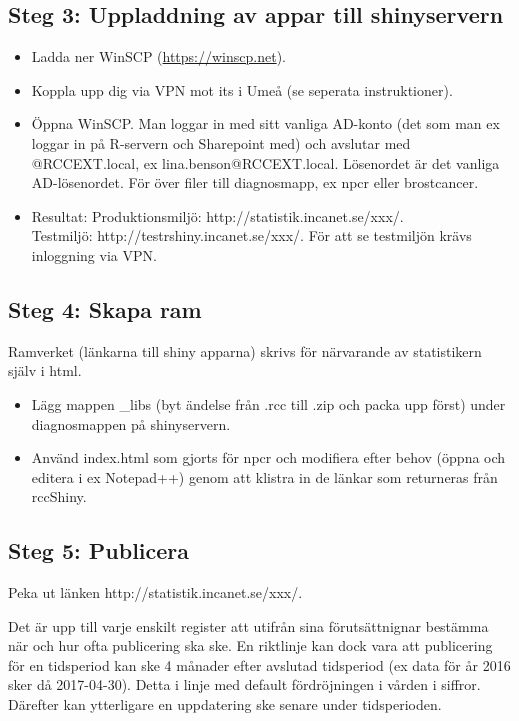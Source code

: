 \documentclass[12pt, a4paper,twoside]{report}
\begin{document}
\subsection{Steg 3: Uppladdning av appar till shinyservern}
\begin{itemize}
\item Ladda ner WinSCP (\url{https://winscp.net}).
\item Koppla upp dig via VPN mot its i Umeå (se seperata instruktioner). 
\item Öppna WinSCP. Man loggar in med sitt vanliga AD-konto (det som man ex loggar in på R-servern och Sharepoint med) och avslutar med @RCCEXT.local, ex lina.benson@RCCEXT.local. Lösenordet är det vanliga AD-lösenordet. För över filer till diagnosmapp, ex npcr eller brostcancer.
\item Resultat: Produktionsmiljö: http://statistik.incanet.se/xxx/. \\
Testmiljö: http://testrshiny.incanet.se/xxx/. För att se testmiljön krävs inloggning via VPN. 
\end{itemize}
\subsection{Steg 4: Skapa ram}
Ramverket (länkarna till shiny apparna) skrivs för närvarande av statistikern själv i html. 
\begin{itemize}
\item Lägg mappen \_libs (byt ändelse från .rcc till .zip och packa upp först) under diagnosmappen på shinyservern. 
\item Använd index.html som gjorts för npcr och modifiera efter behov (öppna och editera i ex Notepad++) genom att klistra in de länkar som returneras från rccShiny. 
\end{itemize}
\subsection{Steg 5: Publicera}
Peka ut länken http://statistik.incanet.se/xxx/.

Det är upp till varje enskilt register att utifrån sina förutsättnignar bestämma när och hur ofta publicering ska ske. En riktlinje kan dock vara att publicering för en tidsperiod kan ske 4 månader efter avslutad tidsperiod (ex data för år 2016 sker då 2017-04-30). Detta i linje med default fördröjningen i vården i siffror. Därefter kan ytterligare en uppdatering ske senare under tidsperioden.  
\end{document}
